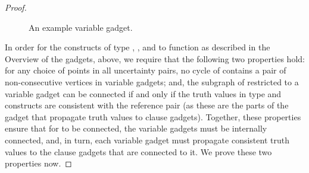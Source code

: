 \begin{proof}
\begin{figure}[h]
\begin{center}


 \endpspicture
\caption{An example variable gadget.}
\label{vble_gadget_points}
\end{center}
\end{figure} 

In order for the constructs of type , , and  to function
as described in the Overview of the gadgets, above, we require that
the following two properties hold: for any choice of points in all
uncertainty pairs, no cycle of  contains a pair of
non-consecutive vertices in variable gadgets; and, the subgraph of
 restricted to a variable gadget can be connected if and only if
the truth values in type  and  constructs are consistent with
the reference pair (as these are the parts of the gadget that
propagate truth values to clause gadgets).  Together, these properties
ensure that for  to be connected, the variable gadgets must be
internally connected, and, in turn, each variable gadget must
propagate consistent truth values to the clause gadgets that are
connected to it. We prove these two properties now.



\end{proof}

